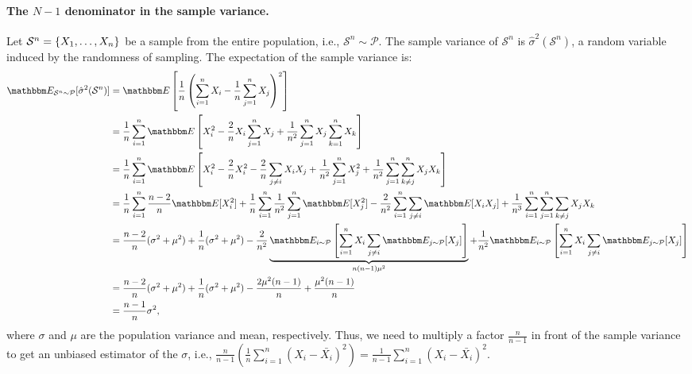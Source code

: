         \paragraph{The $N-1$ denominator in the sample variance.}
            Let $\mathcal{S}^n=\{ X_1, \ldots, X_n \}$ be a sample from the entire population, i.e., $\mathcal{S}^n \sim \mathcal{P}$.
            The sample variance of $\mathcal{S}^n$ is $\hat{\sigma}^2(\mathcal{S}^n)$, a random variable induced by the randomness of sampling.
            The expectation of the sample variance is:
                \begin{equation}
                    \begin{aligned}
                    \E_{\mathcal{S}^n \sim \mathcal{P}}[\hat{\sigma}^2(\mathcal{S}^n)] & = \E\left[ \frac{1}{n} \left( \sum_{i=1}^{n}{X_i - \frac{1}{n}\sum_{j=1}^{n}{X_j}}\right)^2 \right] \\
                    & = \frac{1}{n} \sum_{i=1}^{n}{ \E\left[ X_i^2 - \frac{2}{n}X_i \sum_{j=1}^{n}{X_j} + \frac{1}{n^2}\sum_{j=1}^{n}{X_j\sum_{k=1}^{n}{X_k}} \right]} \\
                    & = \frac{1}{n} \sum_{i=1}^{n}{ \E\left[ X_i^2 - \frac{2}{n}X_i^2 - \frac{2}{n}\sum_{j\ne i}^{}{X_i X_j}  + \frac{1}{n^2}\sum_{j=1}^{n}{X_j^2} + \frac{1}{n^2}\sum_{j=1}^{n}{\sum_{k\ne j}^{n}{X_jX_k}} \right]} \\
                    & = \frac{1}{n}\sum_{i=1}^{n}{\frac{n-2}{n}\E[X_i^2]} + \frac{1}{n}\sum_{i=1}^{n}{\frac{1}{n^2} \sum_{j=1}^{n}{\E[X_j^2]}} - \frac{2}{n^2}\sum_{i=1}^{n}{\sum_{j\ne i}^{}{\E[X_i X_j]}} + \frac{1}{n^3}\sum_{i=1}^{n}{\sum_{j=1}^{n}{\sum_{k \ne j}^{}{X_j X_k}}} \\
                    & = \frac{n-2}{n}(\sigma^2 + \mu^2) + \frac{1}{n}(\sigma^2+\mu^2) - \frac{2}{n^2} \underbrace{\E_{i \sim \mathcal{P}} \left[ \sum_{i=1}^{n} X_i \sum_{j \neq i}^{} \E_{j \sim \mathcal{P}}[X_j] \right]}_{n(n-1)\mu^2} + \frac{1}{n^2} \E_{i \sim \mathcal{P}} \left[ \sum_{i=1}^{n} X_i \sum_{j \neq i}^{} \E_{j \sim \mathcal{P}}[X_j] \right] \\
                    & = \frac{n-2}{n}(\sigma^2 + \mu^2) + \frac{1}{n}(\sigma^2+\mu^2) - \frac{2\mu^2(n-1)}{n} + \frac{\mu^2(n-1)}{n} \\
                    & = \frac{n-1}{n}\sigma^2,
                    \end{aligned}
                \end{equation}
            where $\sigma$ and $\mu$ are the population variance and mean, respectively. 
            Thus, we need to multiply a factor $\frac{n}{n-1}$ in front of the sample variance to get an unbiased estimator of the $\sigma$, i.e., $\frac{n}{n-1} \left( \frac{1}{n}\sum_{i=1}^{n}{\left(X_i - \bar{X_i} \right)^2} \right) = \frac{1}{n-1}\sum_{i=1}^{n}{\left(X_i - \bar{X_i} \right)^2}$. 
        

